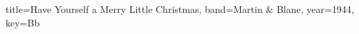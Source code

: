 \documentclass{skrul-leadsheet}
\begin{document}
\begin{song}[transpose-capo=true]{title={Have Yourself a Merry Little Christmas}, band={Martin \& Blane}, year={1944}, key={Bb}}



\end{song}
\end{document}
